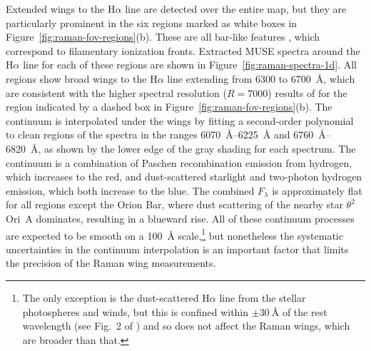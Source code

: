 \documentclass[useAMS, usenatbib, a4paper]{mnras}
\def\th#1#2{\(\theta^{#1}\)\,Ori~#2}
\newcommand\ha{\ensuremath{\text{H}\alpha}}
\begin{document}
Extended wings to the \ha{} line are detected over the entire map, but
they are particularly prominent in the six regions marked as white
boxes in Figure~\ref{fig:raman-fov-regions}(b).  These are all
bar-like features \citep{ODell:2000a, Garcia-Diaz:2007a}, which
correspond to filamentary ionization fronts.  Extracted MUSE spectra
around the \ha{} line for each of these regions are shown in
Figure~\ref{fig:raman-spectra-1d}.  All regions show broad wings to
the \ha{} line extending from \num{6300} to \SI{6700}{\angstrom},
which are consistent with the higher spectral resolution
(\(R = 7000\)) results of \citet{Dopita:2016a} for the region
indicated by a dashed box in Figure~\ref{fig:raman-fov-regions}(b).
The continuum is interpolated under the wings by fitting a
second-order polynomial to clean regions of the spectra in the ranges
\SIrange{6070}{6225}{\angstrom} and \SIrange{6760}{6820}{\angstrom},
as shown by the lower edge of the gray shading for each spectrum.  The
continuum is a combination of Paschen recombination emission from
hydrogen, which increases to the red, and dust-scattered starlight and
two-photon hydrogen emission, which both increase to the blue.  The
combined \(F_\lambda\) is approximately flat for all regions except the
Orion Bar, where dust scattering of the nearby star \th2A{} dominates,
resulting in a blueward rise.  All of these continuum processes are
expected to be smooth on a \SI{100}{\angstrom} scale,\footnote{The
  only exception is the dust-scattered \ha{} line from the stellar
  photospheres and winds, but this is confined within
  \(\pm \SI{30}{\angstrom}\) of the rest wavelength (see Fig.~2 of
  \citealp{Simon-Diaz:2006b}) and so does not affect the Raman wings,
  which are broader than that.}  but nonetheless the systematic
uncertainties in the continuum interpolation is an important factor
that limits the precision of the Raman wing measurements.
\end{document}
